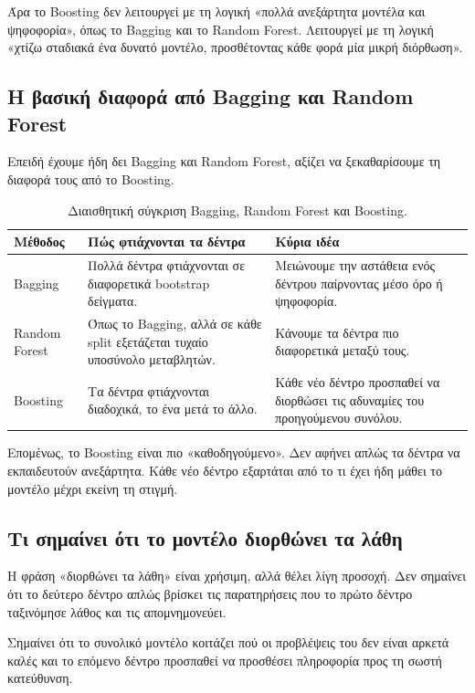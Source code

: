 \documentclass[12pt,a4paper]{article}
\begin{document}
Άρα το Boosting δεν λειτουργεί με τη λογική «πολλά ανεξάρτητα μοντέλα και
ψηφοφορία», όπως το Bagging και το Random Forest. Λειτουργεί με τη λογική
«χτίζω σταδιακά ένα δυνατό μοντέλο, προσθέτοντας κάθε φορά μία μικρή
διόρθωση».

\subsection{Η βασική διαφορά από Bagging και Random Forest}

Επειδή έχουμε ήδη δει Bagging και Random Forest, αξίζει να ξεκαθαρίσουμε τη
διαφορά τους από το Boosting.

\begin{table}[H]
\centering
\caption{Διαισθητική σύγκριση Bagging, Random Forest και Boosting.}
\begin{tabular}{p{}p{}p{}}
\toprule
\textbf{Μέθοδος} & \textbf{Πώς φτιάχνονται τα δέντρα} & \textbf{Κύρια ιδέα} \\
\midrule
Bagging &
Πολλά δέντρα φτιάχνονται σε διαφορετικά bootstrap δείγματα. &
Μειώνουμε την αστάθεια ενός δέντρου παίρνοντας μέσο όρο ή ψηφοφορία. \\
Random Forest &
Όπως το Bagging, αλλά σε κάθε split εξετάζεται τυχαίο υποσύνολο μεταβλητών. &
Κάνουμε τα δέντρα πιο διαφορετικά μεταξύ τους. \\
Boosting &
Τα δέντρα φτιάχνονται διαδοχικά, το ένα μετά το άλλο. &
Κάθε νέο δέντρο προσπαθεί να διορθώσει τις αδυναμίες του προηγούμενου συνόλου. \\
\bottomrule
\end{tabular}
\end{table}

Επομένως, το Boosting είναι πιο «καθοδηγούμενο». Δεν αφήνει απλώς τα δέντρα να
εκπαιδευτούν ανεξάρτητα. Κάθε νέο δέντρο εξαρτάται από το τι έχει ήδη μάθει το
μοντέλο μέχρι εκείνη τη στιγμή.

\subsection{Τι σημαίνει ότι το μοντέλο διορθώνει τα λάθη}

Η φράση «διορθώνει τα λάθη» είναι χρήσιμη, αλλά θέλει λίγη προσοχή. Δεν
σημαίνει ότι το δεύτερο δέντρο απλώς βρίσκει τις παρατηρήσεις που το πρώτο
δέντρο ταξινόμησε λάθος και τις απομνημονεύει.

Σημαίνει ότι το συνολικό μοντέλο κοιτάζει πού οι προβλέψεις του δεν είναι
αρκετά καλές και το επόμενο δέντρο προσπαθεί να προσθέσει πληροφορία προς τη
σωστή κατεύθυνση.
\end{document}
